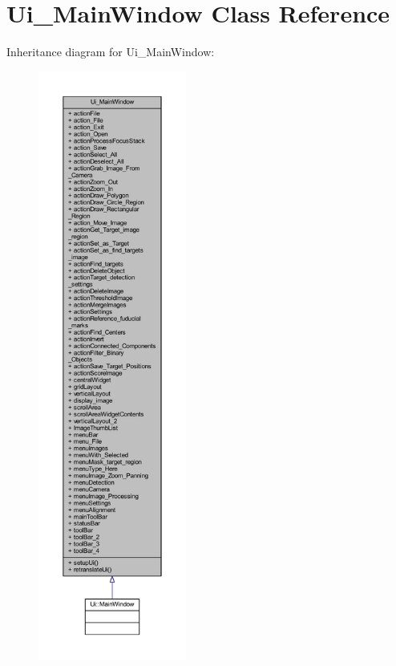 \hypertarget{class_ui___main_window}{}\section{Ui\+\_\+\+Main\+Window Class Reference}
\label{class_ui___main_window}


Inheritance diagram for Ui\+\_\+\+Main\+Window\+:
\nopagebreak
\begin{figure}[H]
\begin{center}
\leavevmode
\includegraphics[height=550pt]{class_ui___main_window__inherit__graph}
\end{center}
\end{figure}


